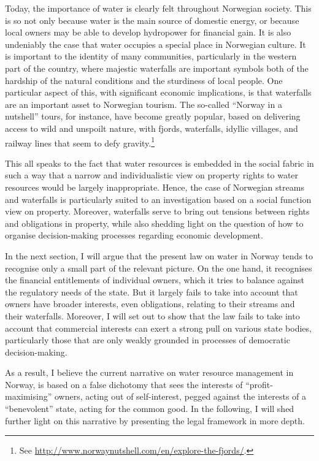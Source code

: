Today, the importance of water is clearly felt throughout Norwegian society. This is so not only because water is the main source of domestic energy, or because local owners may be able to develop hydropower for financial gain. It is also undeniably the case that water occupies a special place in Norwegian culture. It is important to the identity of many communities, particularly in the western part of the country, where majestic waterfalls are important symbols both of the hardship of the natural conditions and the sturdiness of local people. One particular aspect of this, with significant economic implications, is that waterfalls are an important asset to Norwegian tourism. The so-called ``Norway in a nutshell'' tours, for instance, have become greatly popular, based on delivering access to wild and unspoilt nature, with fjords, waterfalls, idyllic villages, and railway lines that seem to defy gravity.\footnote{See \url{http://www.norwaynutshell.com/en/explore-the-fjords/}.}

This all speaks to the fact that water resources is embedded in the social fabric in such a way that a narrow and individualistic view on property rights to water resources would be largely inappropriate. Hence, the case of Norwegian streams and waterfalls is particularly suited to an investigation based on a social function view on property. Moreover, waterfalls serve to bring out tensions between rights and obligations in property, while also shedding light on the question of how to organise decision-making processes regarding economic development.

In the next section, I will argue that the present law on water in Norway tends to recognise only a small part of the relevant picture. On the one hand, it recognises the financial entitlements of individual owners, which it tries to balance against the regulatory needs of the state. But it largely fails to take into account that owners have broader interests, even obligations, relating to their streams and their waterfalls. Moreover, I will set out to show that the law fails to take into account that commercial interests can exert a strong pull on various state bodies, particularly those that are only weakly grounded in processes of democratic decision-making.

As a result, I believe the current narrative on water resource management in Norway, is based on a false dichotomy that sees the interests of ``profit-maximising'' owners, acting out of self-interest, pegged against the interests of a ``benevolent'' state, acting for the common good. In the following, I will shed further light on this narrative by presenting the legal framework in more depth.

